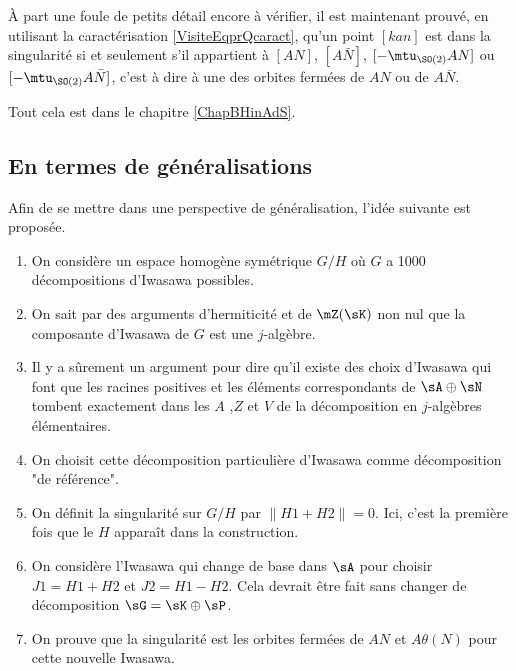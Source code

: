 À part une foule de petits détail encore à vérifier, il est maintenant prouvé, en utilisant la caractérisation \eqref{VisiteEqprQcaract}, qu'un point $[kan]$ est dans la singularité si et seulement s'il appartient à $[AN]$, $[A\bar N]$, $[-\mtu_{\SO(2)}AN]$ ou $[-\mtu_{\SO(2)}A\bar N]$, c'est à dire à une des orbites fermées de $AN$ ou de $A\bar N$.


Tout cela est dans le chapitre \ref{ChapBHinAdS}.

\subsection{En termes de généralisations}

Afin de se mettre dans une perspective de généralisation, l'idée suivante est proposée.

\begin{enumerate}

	\item
		


On considère un espace homogène symétrique $G/H$ où $G$ a 1000 décompositions d'Iwasawa possibles.

\item
 On sait par des arguments d'hermiticité et de $\mZ(\sK)$ non nul que la composante d'Iwasawa de $G$ est une $j$-algèbre.

\item
Il y a sûrement un argument pour dire qu'il existe des choix d'Iwasawa qui font que les racines positives et les éléments correspondants de $\sA\oplus\sN$ tombent exactement dans les $A$ ,$Z$ et $V $ de la décomposition en $j$-algèbres élémentaires.

\item
On choisit cette décomposition particulière d'Iwasawa comme décomposition "de référence".

\item
 On définit la singularité sur $G/H$ par $\| H1+H2\|=0$. Ici, c'est la première fois que le $H$ apparaît dans la construction.

 \item
 On considère l'Iwasawa qui change de base dans $\sA$ pour choisir $J1=H1+H2$ et $J2=H1-H2$. Cela devrait être fait sans changer de décomposition $\sG=\sK\oplus\sP$.

\item		\label{ItemVGDern}
 On prouve que la singularité est les orbites fermées de $AN$ et $A\theta(N)$ pour cette nouvelle Iwasawa.
\end{enumerate}


